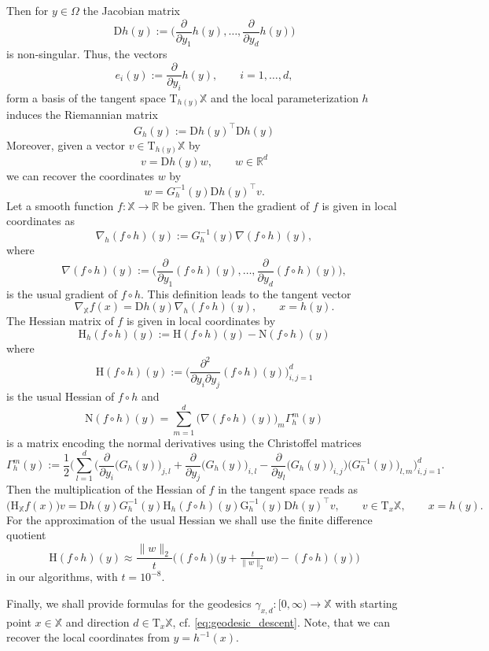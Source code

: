\documentclass[%
a4paper,11pt,DIV=11,%
abstract=on%
]{scrartcl}
\begin{document}
Then for $y \in \Omega$ the Jacobian matrix
\[
  \mathrm D h(y) := \Big(  \frac{\partial}{\partial y_{1}} h(y), \dots, \frac{\partial}{\partial y_{d}} h(y) \Big)
\]
is non-singular. Thus, the vectors
\[
  e_{i}(y) := \frac{\partial}{\partial y_{i}} h(y), \qquad i=1,\dots,d,
\]
form a basis of the tangent space $\mathrm T_{h(y)}\mathbb X$ and the local parameterization $h$ induces the Riemannian matrix
\[
  G_{h}(y) :=  \mathrm D h(y)^{\top} \mathrm D h(y)
\]
Moreover, given a vector $v \in \mathrm T_{h(y)}\mathbb X$ by
\[
  v = \mathrm D h(y) w, \qquad w \in \mathbb R^{d}
\]
we can recover the coordinates $w$ by
\[
 w =   G_{h}^{-1}(y) \mathrm D h(y)^{\top} v.
\]
Let a smooth function $f:\mathbb X \to \mathbb R$ be given. Then the gradient of $f$ is given in local coordinates as
\[
  \nabla_{h} (f \circ h) (y) := G^{-1}_{h}(y) \nabla (f\circ h)(y),
\]
where
\[
  \nabla (f\circ h)(y) := \Big(\frac{\partial}{\partial y_{1}} (f\circ h)(y),\dots,\frac{\partial}{\partial y_{d}} (f\circ h)(y)\Big),
\]
is the usual gradient of $f\circ h$. This definition leads to the tangent vector 
\[
 \nabla_{\mathbb X}f (x) = \mathrm D h(y) \nabla_{h} (f\circ h) (y), \qquad x=h(y).
\]
The Hessian matrix of $f$ is given in local coordinates by
\[
  \mathrm H_{h} (f\circ h) (y) := \mathrm H (f \circ h) (y) - \mathrm N (f\circ h) (y)
\]
where
\[
  \mathrm H (f \circ h) (y) := \Big(\frac{\partial^{2}}{\partial y_{i} \partial y_{j}} (f\circ h)(y)\Big)_{i,j=1}^{d}
\]
is the usual Hessian of $f \circ h$ and
\[
   \mathrm N (f\circ h) (y) = \sum_{m=1}^{d} \big(\nabla (f\circ h)(y)\big)_{m} \Gamma_{h}^{m}(y)
\]
is a matrix encoding the normal derivatives using the Christoffel matrices
\[
  \Gamma_{h}^{m}(y) :=  \frac12  \Big( \sum_{l=1}^{d} \Big(\frac{\partial}{\partial y_{i}}\big(G_{h}(y)\big)_{j,l} + \frac{\partial}{\partial y_{j}}\big(G_{h}(y)\big)_{i,l} - \frac{\partial}{\partial y_{l}}\big(G_{h}(y)\big)_{i,j}\Big) \big(G_{h}^{-1}(y)\big)_{l,m} \Big)_{i,j=1}^{d}.
\]
Then the multiplication of the Hessian of $f$ in the tangent space reads as
\[
\big( \mathrm H_{\mathbb X} f (x) \big) v = \mathrm D h(y) G_{h}^{-1}(y) \mathrm H_{h} (f\circ h) (y) \mathrm G_{h}^{-1}(y) \mathrm D h(y)^{\top} v, \qquad v \in \mathrm T_{x}\mathbb X, \qquad x=h(y).
\]
{\color{blue} For the approximation of the usual Hessian we shall use the finite difference quotient
\[
  \mathrm H(f \circ h)(y) \approx \frac{\|w\|_{2}}{t} \Big( (f \circ h)\big(y + \tfrac{t}{\|w\|_{2}} w\big) - (f\circ h)(y)\Big) 
\]
in our algorithms, with $t=10^{-8}$.}


Finally, we shall provide formulas for the geodesics $\gamma_{x,d}:[0,\infty)\to \mathbb X$ with starting point $x \in \mathbb X$ and direction $d \in \mathrm T_{x}\mathbb X$, cf. \eqref{eq:geodesic_descent}. Note, that we can recover the local coordinates from $y=h^{-1}(x)$.  
\end{document}
